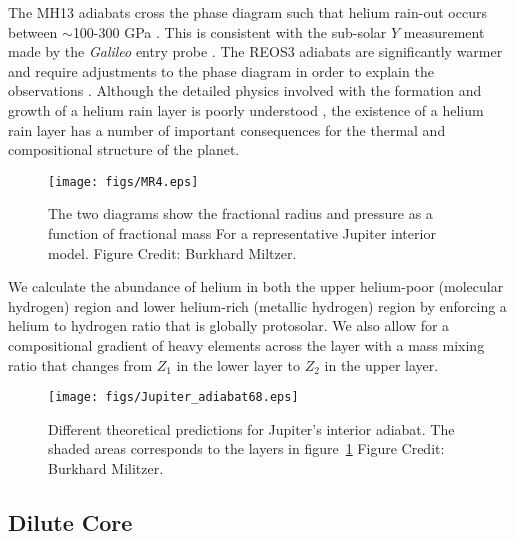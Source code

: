 The MH13 adiabats cross the \citet{morales2013} phase diagram such 
that helium rain-out occurs between $\sim$100-300 GPa \citep{militzer2016}.
This is consistent with the sub-solar $Y$ measurement made by the
\textit{Galileo} entry probe \citep{Zahn1998}. The REOS3 adiabats are
significantly warmer and require adjustments to the phase diagram in order to
explain the observations \citep{nettelmann2015}.  Although the detailed physics
involved with the formation and growth of a helium rain layer is poorly
understood \citep{Fortney2010}, the existence of a helium rain layer has a
number of important consequences for the thermal and compositional structure of
the planet.

\begin{figure}[h]
  \begin{center}
      \noindent\texttt{[image: figs/MR4.eps]}
  \end{center}
  \caption{The two diagrams show the
    fractional radius and pressure as a function of fractional mass
    For a representative Jupiter interior model. Figure Credit: Burkhard Miltzer.}
\label{fig:our_Jupiter_model}
\end{figure}



We calculate the abundance of helium in both the upper helium-poor
(molecular hydrogen) region and lower helium-rich (metallic hydrogen) region by
enforcing a helium to hydrogen ratio that is globally protosolar. We also allow
for a compositional gradient of heavy elements across the layer with a mass
mixing ratio that changes from $Z_1$ in the lower layer to $Z_2$ in the upper
layer. 

\begin{figure}[h]
  \begin{center}
    \noindent\texttt{[image: figs/Jupiter\_adiabat68.eps]}
  \end{center}
  \caption{Different theoretical predictions for Jupiter's interior adiabat. The
      shaded areas corresponds to the layers in figure~\ref{fig:our_Jupiter_model}
  Figure Credit: Burkhard Militzer.}
  \label{fig:jup}
\end{figure}

\subsection{Dilute Core} \label{sec:dilute}

